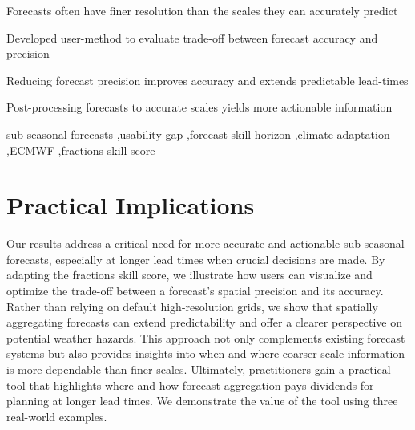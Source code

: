 \documentclass[preprint,12pt,authoryear]{elsarticle}
\begin{document}
\begin{frontmatter}
\begin{highlights}
\item Forecasts often have finer resolution than the scales they can accurately predict
\item Developed user-method to evaluate trade-off between forecast accuracy and precision
\item Reducing forecast precision improves accuracy and extends predictable lead-times
\item Post-processing forecasts to accurate scales yields more actionable information
\end{highlights}

\begin{keyword}
sub-seasonal forecasts \sep usability gap \sep forecast skill horizon \sep climate adaptation \sep ECMWF \sep fractions skill score


\end{keyword}

\end{frontmatter}

\linenumbers




\section*{Practical Implications}

Our results address a critical need for more accurate and actionable sub-seasonal forecasts, especially at longer lead times when crucial decisions are made. By adapting the fractions skill score, we illustrate how users can visualize and optimize the trade-off between a forecast’s spatial precision and its accuracy. Rather than relying on default high-resolution grids, we show that spatially aggregating forecasts can extend predictability and offer a clearer perspective on potential weather hazards. This approach not only complements existing forecast systems but also provides insights into when and where coarser-scale information is more dependable than finer scales. Ultimately, practitioners gain a practical tool that highlights where and how forecast aggregation pays dividends for planning at longer lead times. We demonstrate the value of the tool using three real-world examples.
\end{document}
